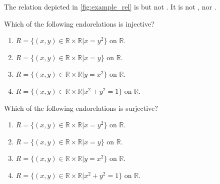 \begin{example}
    The relation depicted in \cref{fig:example_rel} is  but not .
    It is not , nor .
\end{example}

\begin{quiz}
Which of the following endorelations is injective?
\begin{enumerate}[label=(\alph*)]
\item $R=\{(x,y)\in\mathbb{R}\times\mathbb{R}\vert x=y^{2}\}$ on $\mathbb{R}$.
\item $R=\{(x,y)\in\mathbb{R}\times\mathbb{R}\vert x=y\}$ on $\mathbb{R}$.
\item $R=\{(x,y)\in\mathbb{R}\times\mathbb{R}\vert y=x^{2}\}$ on $\mathbb{R}$.
\item $R=\{(x,y)\in\mathbb{R}\times\mathbb{R}\vert x^2+y^{2}=1\}$ on $\mathbb{R}$.
\end{enumerate}
\end{quiz}


\begin{quiz}
Which of the following endorelations is surjective?
\begin{enumerate}[label=(\alph*)]
\item $R=\{(x,y)\in\mathbb{R}\times\mathbb{R}\vert x=y^{2}\}$ on $\mathbb{R}$.
\item $R=\{(x,y)\in\mathbb{R}\times\mathbb{R}\vert x=y\}$ on $\mathbb{R}$.
\item $R=\{(x,y)\in\mathbb{R}\times\mathbb{R}\vert y=x^{2}\}$ on $\mathbb{R}$.
\item $R=\{(x,y)\in\mathbb{R}\times\mathbb{R}\vert x^2+y^{2}=1\}$ on $\mathbb{R}$.
\end{enumerate}
\end{quiz}